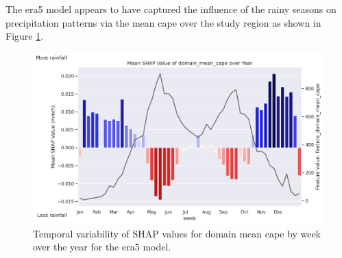The \acrshort{era5} model appears to have captured the influence of the rainy seasons  on precipitation patterns via the mean \acrshort{cape} over the study region as shown in Figure \ref{fig:obs_precipitation_era5_shap_domain_mean_cape_by_week_over_year}.

\begin{figure}[ht]
    \centering
    \includegraphics[width=\textwidth]{../figures/generated/experiments/obs_precipitation/temporal_corr/obs_precipitation_era5_shap_domain_mean_cape_by_week_over_year.png}
    \caption{Temporal variability of SHAP values for domain mean \acrshort{cape} by week over the year for the \acrshort{era5} model.}
    \label{fig:obs_precipitation_era5_shap_domain_mean_cape_by_week_over_year}
\end{figure}